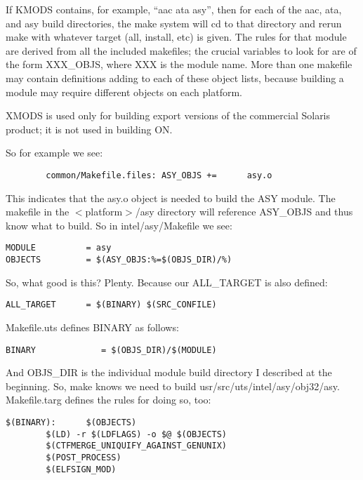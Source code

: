 \documentclass{article}
\begin{document}
If KMODS contains, for example, ``aac ata asy'', then for each of the aac, ata,
and asy build directories, the make system will cd to that directory and rerun
make with whatever target (all, install, etc) is given. The rules for that
module are derived from all the included makefiles; the crucial variables to
look for are of the form XXX\_OBJS, where XXX is the module name. More than one
makefile may contain definitions adding to each of these object lists, because
building a module may require different objects on each platform.

XMODS is used only for building export versions of the commercial Solaris
product; it is not used in building ON.

So for example we see:

\begin{verbatim}
        common/Makefile.files: ASY_OBJS +=      asy.o
\end{verbatim}

This indicates that the asy.o object is needed to build the ASY module. The
makefile in the $<$platform$>$/asy directory will reference ASY\_OBJS and thus
know what to build. So in intel/asy/Makefile we see:

\begin{verbatim}
MODULE          = asy
OBJECTS         = $(ASY_OBJS:%=$(OBJS_DIR)/%)
\end{verbatim}

So, what good is this? Plenty. Because our ALL\_TARGET is also defined:

\begin{verbatim}
ALL_TARGET      = $(BINARY) $(SRC_CONFILE)
\end{verbatim}

Makefile.uts defines BINARY as follows:

\begin{verbatim}
BINARY             = $(OBJS_DIR)/$(MODULE)
\end{verbatim}

\vspace{0.2cm}
And OBJS\_DIR is the individual module build directory I described at the
beginning. So, make knows we need to build
usr/src/uts/intel/asy/obj32/asy. Makefile.targ defines the rules for doing so,
too:

\begin{verbatim}
$(BINARY):      $(OBJECTS)
        $(LD) -r $(LDFLAGS) -o $@ $(OBJECTS)
        $(CTFMERGE_UNIQUIFY_AGAINST_GENUNIX)
        $(POST_PROCESS)
        $(ELFSIGN_MOD)
\end{verbatim}
\end{document}
